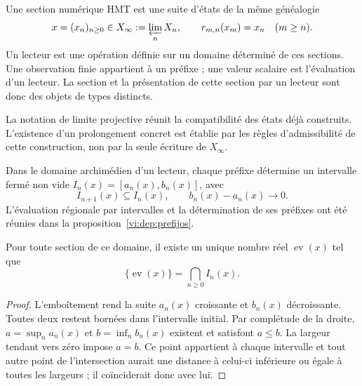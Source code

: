 \begin{definition}
Une section numérique HMT est une suite d’états de la même généalogie
\begin{equation}
 x=(x_n)_{n\ge0}\in X_\infty:=\varprojlim_n X_n,
 \qquad r_{m,n}(x_m)=x_n\quad(m\ge n).
 \label{vi:hist:limite-inverso}
\end{equation}
Un lecteur est une opération définie sur un domaine déterminé de ces
sections. Une observation finie appartient à un préfixe ; une valeur scalaire
est l’évaluation d’un lecteur. La section et la présentation de cette section
par un lecteur sont donc des objets de types distincts.
\end{definition}

La notation de limite projective réunit la compatibilité des états déjà
construits. L’existence d’un prolongement concret est établie
par les règles d’admissibilité de cette construction, non par la
seule écriture de \(X_\infty\).

Dans le domaine archimédien d’un lecteur, chaque préfixe détermine un
intervalle fermé non vide \(I_n(x)=[a_n(x),b_n(x)]\), avec
\begin{equation}
 I_{n+1}(x)\subseteq I_n(x),\qquad
 b_n(x)-a_n(x)\longrightarrow0.
 \label{vi:hist:cilindros}
\end{equation}
L’évaluation régionale par intervalles et la détermination de ses préfixes ont
été réunies dans la proposition~\ref{vi:dep:prefijos}.

\begin{proposition}
Pour toute section de ce domaine, il existe un unique nombre réel
\(\operatorname{ev}(x)\) tel que
\begin{equation}
 \{\operatorname{ev}(x)\}=\bigcap_{n\ge0}I_n(x).
 \label{vi:hist:evaluacion}
\end{equation}
\end{proposition}
\begin{proof}
L’emboîtement rend la suite \(a_n(x)\) croissante et
\(b_n(x)\) décroissante. Toutes deux restent bornées dans l’intervalle initial. Par
complétude de la droite, \(a=\sup_n a_n(x)\) et
\(b=\inf_n b_n(x)\) existent et satisfont \(a\le b\).
La largeur tendant vers zéro impose \(a=b\). Ce point appartient à chaque
intervalle et tout autre point de l’intersection aurait une distance à
celui-ci inférieure ou égale à toutes les largeurs ; il coïnciderait donc avec lui.
\end{proof}

